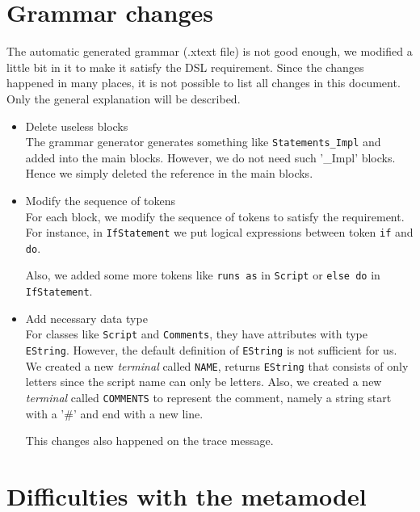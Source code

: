 \documentclass[a4paper, 11pt]{article}
\begin{document}
\section{Grammar changes}

The automatic generated grammar (.xtext file) is not good enough, we modified a little bit in it to make it satisfy the DSL requirement. Since the changes happened in many places, it is not possible to list all changes in this document. Only the general explanation will be described. 

\begin{itemize}
\item Delete useless blocks \\
The grammar generator generates something like \texttt{Statements\_Impl} and added into the main blocks. However, we do not need such '\_Impl' blocks. Hence we simply deleted the reference in the main blocks. 

\item Modify the sequence of tokens \\
For each block, we modify the sequence of tokens to satisfy the requirement. For instance, in \texttt{IfStatement} we put logical expressions between token \texttt{if} and \texttt{do}. \bigbreak

Also, we added some more tokens like \texttt{runs as} in \texttt{Script} or \texttt{else do} in \texttt{IfStatement}. 

\item Add necessary data type \\
For classes like \texttt{Script} and \texttt{Comments}, they have attributes with type \texttt{EString}. However, the default definition of \texttt{EString} is not sufficient for us. We created a new \textit{terminal} called \texttt{NAME}, returns \texttt{EString} that consists of only letters since the script name can only be letters. Also, we created a new \textit{terminal} called \texttt{COMMENTS} to represent the comment, namely a string start with a '\#' and end with a new line. \bigbreak

This changes also happened on the trace message. 

\end{itemize}

\section{Difficulties with the metamodel}
\end{document}
